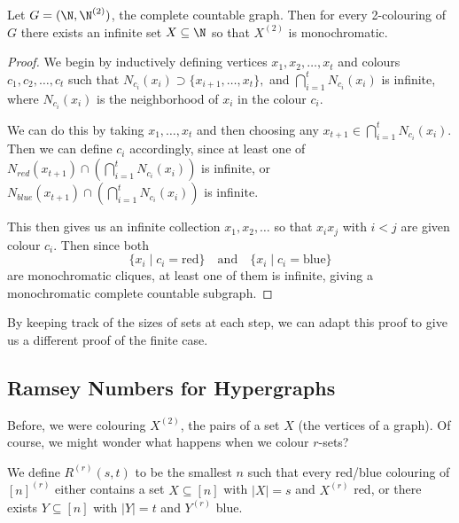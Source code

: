 \documentclass[a4paper]{scrartcl}
\begin{document}
\begin{theorem}
	Let $G= (\N, \N^{(2)})$, the complete countable graph. Then for every 2-colouring of $G$ there exists an infinite set $X \subseteq \N$ so that $X^{(2)}$ is monochromatic.
\end{theorem}
\begin{proof}
	We begin by inductively defining vertices $x_1, x_2, \dots, x_t$ and colours $c_1, c_2, \dots, c_t$ such that 
	$N_{c_i}(x_i) \supset \{x_{i + 1}, \dots, x_{t}\},$
	and
	$
	\bigcap_{i = 1}^t N_{c_i}(x_i)
	$ is infinite, where $N_{c_i}(x_i)$ is the neighborhood of $x_i$ in the colour $c_i$.

	We can do this by taking $x_1, \dots, x_t$ and then choosing any $x_{t + 1} \in \bigcap_{i = 1}^t N_{c_i}(x_i)$. Then we can define $c_i$ accordingly, since at least one of $N_{red}(x_{t + 1}) \cap \left(\bigcap_{i = 1}^t N_{c_i}(x_i)\right)$ is infinite, or $N_{blue}(x_{t + 1}) \cap \left(\bigcap_{i = 1}^t N_{c_i}(x_i)\right)$ is infinite.

	This then gives us an infinite collection $x_1, x_2, \dots$ so that $x_i x_j$ with $i < j$ are given colour $c_i$. Then since both
	$$
	\{x_i \mid c_i = \text{red}\} \quad \text{and} \quad \{x_i \mid c_i = \text{blue}\}
	$$
	are monochromatic cliques, at least one of them is infinite, giving a monochromatic complete countable subgraph.
\end{proof}

\begin{remark}
	By keeping track of the sizes of sets at each step, we can adapt this proof to give us a different proof of the finite case.
\end{remark}

\subsection{Ramsey Numbers for Hypergraphs}

Before, we were colouring $X^{(2)}$, the pairs of a set $X$ (the vertices of a graph). Of course, we might wonder what happens when we colour $r$-sets?

\begin{definition}
	We define $R^{(r)}(s, t)$ to be the smallest $n$ such that every red/blue colouring of $[n]^{(r)}$ either contains a set $X \subseteq [n]$ with $|X| = s$ and $X^{(r)}$ red, or there exists $Y \subseteq[n]$ with $|Y| = t$ and $Y^{(r)}$ blue.
\end{definition}
\end{document}
